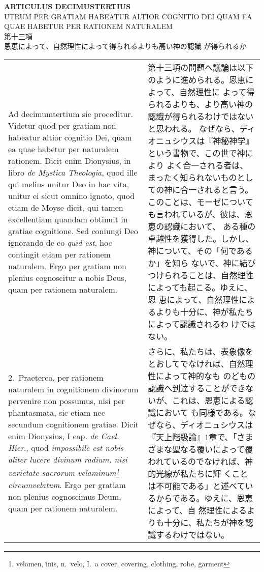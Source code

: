 \documentclass[10pt]{jsarticle} %
\begin{document}
\newpage
{}

\begin{center}
 {\Large {\bf ARTICULUS DECIMUSTERTIUS}}\\
{\large UTRUM PER GRATIAM HABEATUR ALTIOR COGNITIO DEI QUAM EA QUAE
 HABETUR PER RATIONEM NATURALEM}\\
{\large 第十三項\\恩恵によって、自然理性によって得られるよりも高い神の認識
 が得られるか}
\end{center}

\begin{longtable}{p{21em}p{21em}}

{\sc Ad decimumtertium sic proceditur}. Videtur quod per gratiam non
habeatur altior cognitio Dei, quam ea quae habetur per naturalem
rationem. Dicit enim Dionysius, in libro {\it de Mystica Theologia},
quod ille qui melius unitur Deo in hac vita, unitur ei sicut omnino
ignoto, quod etiam de Moyse dicit, qui tamen excellentiam quandam
obtinuit in gratiae cognitione. Sed coniungi Deo ignorando de eo {\it
quid est}, hoc contingit etiam per rationem naturalem. Ergo per
gratiam non plenius cognoscitur a nobis Deus, quam per rationem
naturalem.

&

第十三項の問題へ議論は以下のように進められる。恩恵によって、自然理性に
よって得られるよりも、より高い神の認識が得られるわけではないと思われる。
なぜなら、ディオニュシウスは『神秘神学』という書物で、この世で神により
よく合一される者は、まったく知られないものとしての神に合一されると言う。
このことは、モーゼについても言われているが、彼は、恩恵の認識において、
ある種の卓越性を獲得した。しかし、神について、その「何であるか」を知ら
ないで、神に結びつけられることは、自然理性によっても起こる。ゆえに、恩
恵によって、自然理性によるよりも十分に、神が私たちによって認識されるわ
けではない。

\\

2.~{\sc Praeterea}, per rationem naturalem in cognitionem divinorum
pervenire non possumus, nisi per phantasmata, sic etiam nec secundum
cognitionem gratiae. Dicit enim Dionysius, I cap. {\it de
Cael. Hier}., quod {\it impossibile est nobis aliter lucere divinum
radium, nisi varietate sacrorum velaminum\footnote{v\={e}l\={a}men,
\u{\i}nis, n.\ velo, I.~a cover, covering, clothing, robe, garment}
circumvelatum}. Ergo per gratiam non plenius cognoscimus Deum, quam
per rationem naturalem.

&

さらに、私たちは、表象像をとおしてでなければ、自然理性によって神的なも
のどもの認識へ到達することができないが、これは、恩恵による認識において
も同様である。なぜなら、ディオニュシウスは『天上階級論』1章で、「さま
ざまな聖なる覆いによって覆われているのでなければ、神的光線が私たちに輝
くことは不可能である」と述べているからである。ゆえに、恩恵によって、自
然理性によるよりも十分に、私たちが神を認識するわけではない。


\end{longtable}
\end{document}
